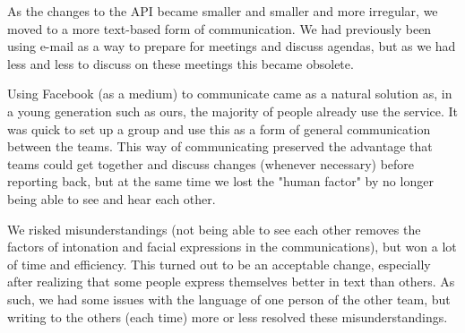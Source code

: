 As the changes to the API became smaller and smaller and more irregular, we moved to a more text-based form of communication. We had
previously been using e-mail as a way to prepare for meetings and discuss agendas, but as we had less and less to discuss on these
meetings this became obsolete.

Using Facebook (as a medium) to communicate came as a natural solution as, in a young generation such as ours, the majority of people
already use the service. It was quick to set up a group and use this as a form of general communication between the teams. This way
of communicating preserved the advantage that teams could get together and discuss changes (whenever necessary) before reporting back,
but at the same time we lost the "human factor" by no longer being able to see and hear each other.

We risked misunderstandings (not being able to see each other removes the factors of intonation and facial expressions in the communications),
but won a lot of time and efficiency. This turned out to be an acceptable change, especially after realizing that some people express
themselves better in text than others. As such, we had some issues with the language of one person of the other team, but writing to the
others (each time) more or less resolved these misunderstandings.
